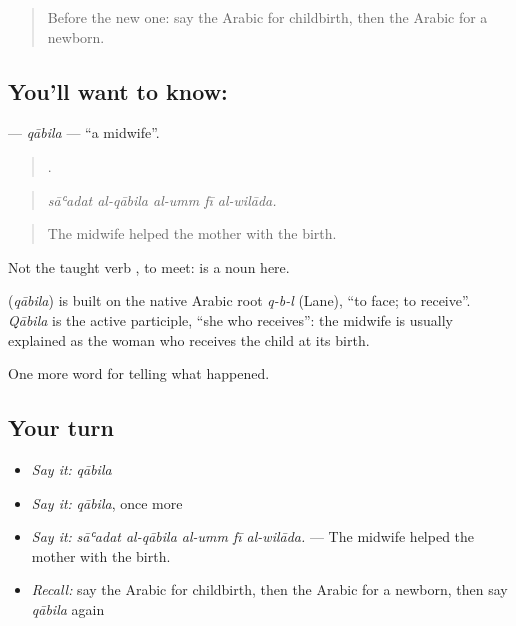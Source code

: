 \label{lesson:AR-C311-qabila-midwife}



\begin{quote}
Before the new one: say the Arabic for childbirth, then the Arabic for a newborn.
\end{quote}

\subsection*{You'll want to know: }
\textbf{} — \emph{qābila} — \textquotedblleft{}a midwife\textquotedblright{}.

\begin{quote}
    .
\end{quote}

\begin{quote}
\emph{sāʿadat al-qābila al-umm fī al-wilāda.}
\end{quote}

\begin{quote}
The midwife helped the mother with the birth.
\end{quote}

Not the taught verb , to meet:  is a noun here.

\begin{cousinweb}
\textbf{} (\emph{qābila}) is built on the native Arabic root \emph{q-b-l} (Lane), \textquotedblleft{}to face; to receive\textquotedblright{}. \emph{Qābila} is the active participle, \textquotedblleft{}she who receives\textquotedblright{}: the midwife is usually explained as the woman who receives the child at its birth.
\end{cousinweb}

\begin{grammarlens}[title={What you've built}]
One more word for telling what happened.
\end{grammarlens}

\subsection*{Your turn}
\begin{itemize}
\raggedright
  \item \emph{Say it:} \emph{qābila}
  \item \emph{Say it:} \emph{qābila}, once more
  \item \emph{Say it:} \emph{sāʿadat al-qābila al-umm fī al-wilāda.} — The midwife helped the mother with the birth.
  \item \emph{Recall:} say the Arabic for childbirth, then the Arabic for a newborn, then say \emph{qābila} again
\end{itemize}


